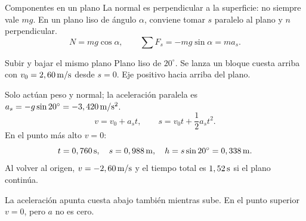 \documentclass[10pt,a4paper]{article}
\begin{document}
\begin{lessoncard}{Componentes en un plano}
La normal es perpendicular a la superficie: no siempre vale $mg$. En un plano liso de \'angulo $\alpha$, conviene tomar $s$ paralelo al plano y $n$ perpendicular.
\[
N=mg\cos\alpha,\qquad \sum F_s=-mg\sin\alpha=ma_s.
\]
\begin{center}
\end{center}
\end{lessoncard}

\begin{examplebox}{Subir y bajar el mismo plano}
Plano liso de $20^\circ$. Se lanza un bloque cuesta arriba con $v_0=2,60\,\mathrm{m/s}$ desde $s=0$. Eje positivo hacia arriba del plano.

 Solo act\'uan peso y normal; la aceleraci\'on paralela es $a_s=-g\sin20^\circ=-3,420\,\mathrm{m/s^2}$.
\[
v=v_0+a_st,\qquad s=v_0t+\frac12 a_st^2.
\]
 En el punto m\'as alto $v=0$:
\[
t=0,760\,\mathrm{s},\quad s=0,988\,\mathrm{m},\quad h=s\sin20^\circ=0,338\,\mathrm{m}.
\]
Al volver al origen, $v=-2,60\,\mathrm{m/s}$ y el tiempo total es $1,52\,\mathrm{s}$ si el plano contin\'ua.

 La aceleraci\'on apunta cuesta abajo tambi\'en mientras sube. En el punto superior $v=0$, pero $a$ no es cero.
\end{examplebox}
\end{document}
